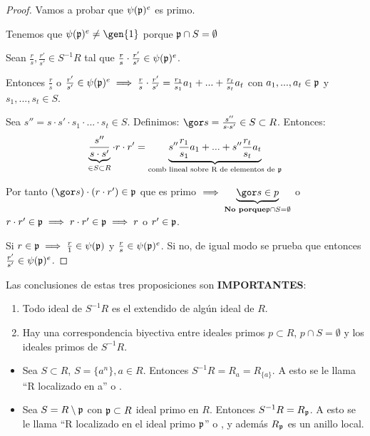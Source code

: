 \begin{proof}
	Vamos a probar que $\psi(\mathfrak{p})^e$ es primo.

	Tenemos que $\psi(\pideal)^e\neq \gen{1}$ porque $\mathfrak{p} \cap S= \emptyset$

	Sean $\frac{r}{s},\frac{r'}{s'} \in S^{-1}R$ tal que $\frac{r}{s}\cdot\frac{r'}{s'} \in \psi(\mathfrak{p})^e$.

	Entonces $\frac{r}{s}$ o $\frac{r'}{s'} \in \psi(\mathfrak{p})^e \implies \frac{r}{s}\cdot\frac{r'}{s'}=\frac{r_1}{s_1}a_1+...+\frac{r_t}{s_t}a_t$ con $a_1,...,a_t \in \mathfrak{p}$ y $s_1,...,s_t \in S$.

	Sea $s''=s\cdot s' \cdot s_1 \cdot...\cdot s_t \in S$. Definimos: $\cls{s}=\frac{s''}{s\cdot s'} \in S \subset R$. Entonces:
	$$ \underbrace{\frac{s''}{s\cdot s'}}_{\in S \subset R}\cdot r \cdot r'=\underbrace{s''\frac{r_1}{s_1}a_1+...+s''\frac{r_t}{s_t}a_t}_{\text{comb lineal sobre R de elementos de }\mathfrak{p}} $$

	Por tanto $(\cls{s})\cdot(r \cdot r') \in \pideal$ que es primo $\implies \underbrace{\cls{s}\in p}_{\textbf{No porque}\pideal \cap S = \emptyset}$ o $r\cdot r' \in \mathfrak{p} \implies r \cdot r' \in \mathfrak{p} \implies r$ o $r' \in \mathfrak{p}$.

	Si $r \in \mathfrak{p} \implies \frac{r}{1} \in \psi(\mathfrak{p})$ y $\frac{r}{s} \in \psi(\mathfrak{p})^e$. Si no, de igual modo se prueba que entonces $\frac{r'}{s'}\in \psi(\mathfrak{p})^e$.
\end{proof}

Las conclusiones de estas tres proposiciones son \textbf{IMPORTANTES}:
\begin{enumerate}
	\item Todo ideal de $S^{-1}R$ es el extendido de algún ideal de $R$.
	\item Hay una correspondencia biyectiva entre ideales primos $p \subset R$, $p \cap S = \emptyset$ y los ideales primos de $S^{-1}R$.
\end{enumerate}

\notacion
\begin{itemize}
	\item Sea $S \subset R$, $S=\{ a^n \}, a \in R$. Entonces $S^{-1}R=R_a=R_{\{a\}}$. A esto se le llama ``R localizado en a'' o .
	\item Sea $S=R \setminus \mathfrak{p}$ con $\mathfrak{p} \subset R$ ideal primo en $R$. Entonces $S^{-1}R=R_\mathfrak{p}$. A esto se le llama ``R localizado en el ideal primo $\mathfrak{p}$'' o , y además $R_\mathfrak{p}$ es un anillo local.
\end{itemize}


